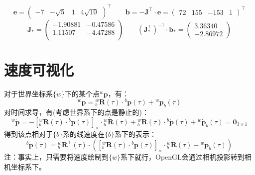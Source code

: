 \documentclass[12pt, onecolumn]{article}
\newcommand\normf{\fangsong}
\newcommand\liehat[1]{\left[ #1 \right]_\times}
\begin{document}
	\begin{equation}
	\boldsymbol{e}=\begin{pmatrix}
	-7&-\sqrt{5}&1&4\sqrt{10}
	\end{pmatrix}^\top
	\qquad
	\boldsymbol{b}=-\boldsymbol{J}^\top\cdot\boldsymbol{e}=\begin{pmatrix}
	72&155&-153&1
	\end{pmatrix}^\top
	\end{equation}
	\begin{equation}
	\boldsymbol{J}_*=\begin{pmatrix}
	-1.90881 &-0.47586\\
	1.11507 &-4.47288\\
	\end{pmatrix}
	\qquad
	\left( {\boldsymbol{J}_*^\top}\right) ^{-1}\cdot\boldsymbol{b}_*=\begin{pmatrix}
	3.36340\\
	-2.86972
	\end{pmatrix}
	\end{equation}
	
	\section{\normf 速度可视化}
	对于世界坐标系$\{w\}$下的某个点${^w\boldsymbol{p}}$，有：
	\begin{equation}
	{^w\boldsymbol{p}}={^w_b\boldsymbol{R}(\tau)}\cdot{^b\boldsymbol{p}}(\tau)+{^w\boldsymbol{p}_b}(\tau)
	\end{equation}
	对时间求导，有(考虑世界系下的点是静止的)：
	\begin{equation}
	{^w\dot{\boldsymbol{p}}}=
	-\liehat{{^w_b\boldsymbol{R}(\tau)}\cdot{^b\boldsymbol{p}}(\tau)}\cdot{^w_b\dot{\boldsymbol{R}}(\tau)}
	+{^w_b\boldsymbol{R}(\tau)}\cdot{^b\dot{\boldsymbol{p}}}(\tau)
	+{^w\dot{\boldsymbol{p}}_b}(\tau)=\boldsymbol{0}_{3\times 1}
	\end{equation}
	得到该点相对于$\{b\}$系的线速度在$\{b\}$系下的表示：
	\begin{equation}
	{^b\dot{\boldsymbol{p}}}(\tau)=
	{^w_b\boldsymbol{R}^\top(\tau)}\cdot\left( \liehat{{^w_b\boldsymbol{R}(\tau)}\cdot{^b\boldsymbol{p}}(\tau)}\cdot{^w_b\dot{\boldsymbol{R}}(\tau)}
	-{^w\dot{\boldsymbol{p}}_b}(\tau)\right) 
	\end{equation}
	注：事实上，只需要将速度绘制到$\{w\}$系下就行，OpenGL会通过相机投影转到相机坐标系下。
	
\end{document}

